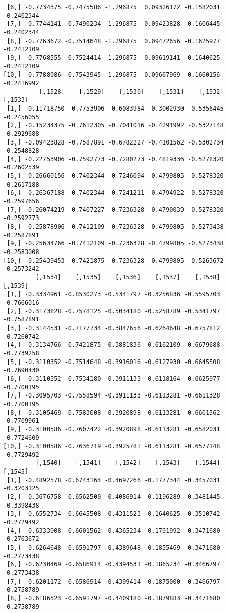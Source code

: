 \documentclass[
  letterpaper,
  DIV=11,
  numbers=noendperiod]{scrreprt}
\begin{document}
\begin{verbatim}
 [6,] -0.7734375 -0.7475586 -1.296875  0.09326172 -0.1582031 -0.2402344
 [7,] -0.7744141 -0.7490234 -1.296875  0.09423828 -0.1606445 -0.2402344
 [8,] -0.7763672 -0.7514648 -1.296875  0.09472656 -0.1625977 -0.2412109
 [9,] -0.7768555 -0.7524414 -1.296875  0.09619141 -0.1640625 -0.2412109
[10,] -0.7788086 -0.7543945 -1.296875  0.09667969 -0.1660156 -0.2416992
          [,1528]    [,1529]    [,1530]    [,1531]    [,1532]    [,1533]
 [1,]  0.11718750 -0.7753906 -0.6083984 -0.3002930 -0.5356445 -0.2456055
 [2,] -0.15234375 -0.7612305 -0.7041016 -0.4291992 -0.5327148 -0.2929688
 [3,] -0.09423828 -0.7587891 -0.6782227 -0.4101562 -0.5302734 -0.2548828
 [4,] -0.22753906 -0.7592773 -0.7280273 -0.4819336 -0.5278320 -0.2602539
 [5,] -0.26660156 -0.7402344 -0.7246094 -0.4799805 -0.5278320 -0.2617188
 [6,] -0.26367188 -0.7402344 -0.7241211 -0.4794922 -0.5278320 -0.2597656
 [7,] -0.26074219 -0.7407227 -0.7236328 -0.4790039 -0.5278320 -0.2592773
 [8,] -0.25878906 -0.7412109 -0.7236328 -0.4799805 -0.5273438 -0.2587891
 [9,] -0.25634766 -0.7412109 -0.7236328 -0.4799805 -0.5273438 -0.2583008
[10,] -0.25439453 -0.7421875 -0.7236328 -0.4799805 -0.5263672 -0.2573242
         [,1534]    [,1535]    [,1536]    [,1537]    [,1538]    [,1539]
 [1,] -0.3334961 -0.8530273 -0.5341797 -0.3256836 -0.5595703 -0.7666016
 [2,] -0.3173828 -0.7578125 -0.5034180 -0.5258789 -0.5341797 -0.7587891
 [3,] -0.3144531 -0.7177734 -0.3847656 -0.6264648 -0.6757812 -0.7260742
 [4,] -0.3134766 -0.7421875 -0.3881836 -0.6162109 -0.6679688 -0.7739258
 [5,] -0.3110352 -0.7514648 -0.3916016 -0.6127930 -0.6645508 -0.7690430
 [6,] -0.3110352 -0.7534180 -0.3911133 -0.6118164 -0.6625977 -0.7700195
 [7,] -0.3095703 -0.7558594 -0.3911133 -0.6113281 -0.6611328 -0.7700195
 [8,] -0.3105469 -0.7583008 -0.3920898 -0.6113281 -0.6601562 -0.7709961
 [9,] -0.3100586 -0.7607422 -0.3920898 -0.6113281 -0.6582031 -0.7724609
[10,] -0.3100586 -0.7636719 -0.3925781 -0.6113281 -0.6577148 -0.7729492
         [,1540]    [,1541]    [,1542]    [,1543]    [,1544]    [,1545]
 [1,] -0.4892578 -0.6743164 -0.4697266 -0.1777344 -0.3457031 -0.3203125
 [2,] -0.3676758 -0.6562500 -0.4086914 -0.1196289 -0.3481445 -0.3398438
 [3,] -0.6552734 -0.6645508 -0.4311523 -0.1640625 -0.3510742 -0.2729492
 [4,] -0.6333008 -0.6601562 -0.4365234 -0.1791992 -0.3471680 -0.2763672
 [5,] -0.6264648 -0.6591797 -0.4389648 -0.1855469 -0.3471680 -0.2773438
 [6,] -0.6230469 -0.6586914 -0.4394531 -0.1865234 -0.3466797 -0.2773438
 [7,] -0.6201172 -0.6586914 -0.4399414 -0.1875000 -0.3466797 -0.2758789
 [8,] -0.6186523 -0.6591797 -0.4409180 -0.1879883 -0.3471680 -0.2758789

\end{verbatim}
\end{document}
